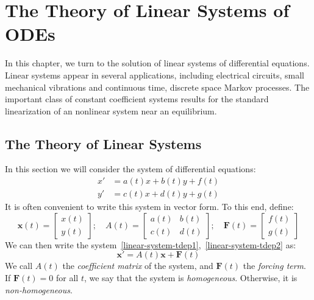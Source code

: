
\chapter{The Theory of Linear Systems of ODEs}

In this chapter, we turn to the solution of linear systems of differential equations. Linear systems appear in several applications, including electrical circuits, small mechanical vibrations and continuous time, discrete space Markov processes. The important class of constant coefficient systems results for the standard linearization of an nonlinear system near an equilibrium.



\section{The Theory of Linear Systems}

In this section we will consider the system of differential equations:
\begin{align}
\label{linear-system-tdep1}
x'&=a(t)x+b(t)y+f(t)\\
\label{linear-system-tdep2}
y'&=c(t)x+d(t)y+g(t)
\end{align}
It is often convenient to write this system in vector form. To this end, define:
\[
\mathbf{x}(t)=\begin{bmatrix}x(t)\\y(t)\end{bmatrix};\quad
A(t)=\begin{bmatrix}a(t)&b(t)\\c(t)&d(t)\end{bmatrix};\quad
\mathbf{F}(t)=\begin{bmatrix}f(t)\\g(t)\end{bmatrix}
\]
We can then write the system~\eqref{linear-system-tdep1},~\eqref{linear-system-tdep2} as:
\begin{equation}
\label{linear-system-tdep-vector}
\mathbf{x}'=A(t)\mathbf{x}+\mathbf{F}(t)
\end{equation}
We call $A(t)$ the \emph{coefficient matrix} of the system, and $\mathbf{F}(t)$ the \emph{forcing term}. If $\mathbf{F}(t)=0$ for all $t$, we say that the system is \emph{homogeneous}. Otherwise, it is \emph{non-homogeneous}.

